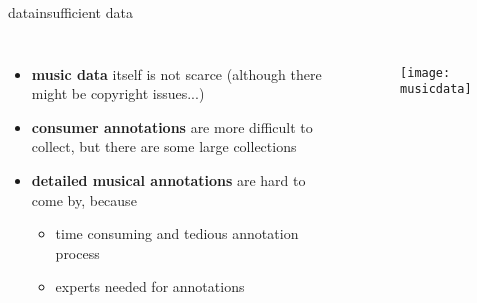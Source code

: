 \begin{frame}{data}{insufficient data}
    
    \bigskip
    \begin{columns}
    \begin{itemize}
        \item<1->   \textbf{music data} itself is not scarce (although there might be copyright issues...)
        \smallskip
        \item<2->   \textbf{consumer annotations} are more difficult to collect, but there are some large collections
        \smallskip
        \item<3->   \textbf{detailed musical annotations} are hard to come by, because
        \begin{itemize}
            \item   time consuming and tedious annotation process
            \item   experts needed for annotations
        \end{itemize}
    \end{itemize}
    \begin{figure}
        \texttt{[image: musicdata]}
    \end{figure}
    \end{columns}
\end{frame}
